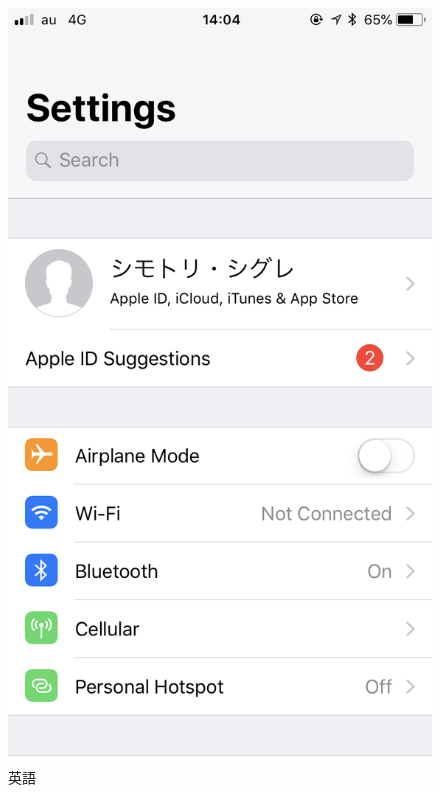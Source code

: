 
\begin{figure}[htbp]
    \begin{minipage}{0.5\hsize}
        \begin{center}
            \includegraphics[width=\linewidth]{images/ios_preferences_ltr.png}
        \end{center}
        \caption{英語}
    \end{minipage}
    \begin{minipage}{0.5\hsize}
        \begin{center}

\end{center}
\end{minipage}
\end{figure}
